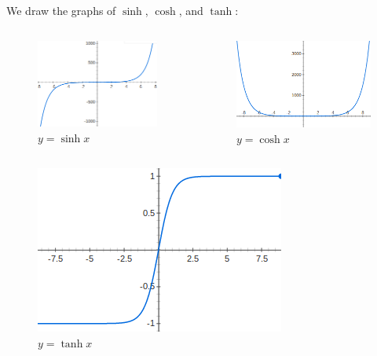 \documentclass[t]{beamer}
\theoremstyle{plain}
\theoremstyle{definition}
\begin{document}
\begin{frame}
We draw the graphs of $\sinh$, $\cosh$, and $\tanh$:

\begin{center}
\begin{columns}[t]
\begin{column}{0.5\textwidth}
\begin{figure}
\includegraphics[scale=.3]{sinhx.png}
\caption{$y=\sinh x$}
\end{figure}
\end{column}
\begin{column}{0.5\textwidth}
\begin{figure}
\includegraphics[scale=.3]{coshx.png}
\caption{$y=\cosh x$}
\end{figure}
\end{column}
\end{columns}
\begin{figure}
\includegraphics[scale=.3]{tanhx.png}
\caption{$y=\tanh x$}
\end{figure}
\end{center}
\end{frame}
\end{document}
